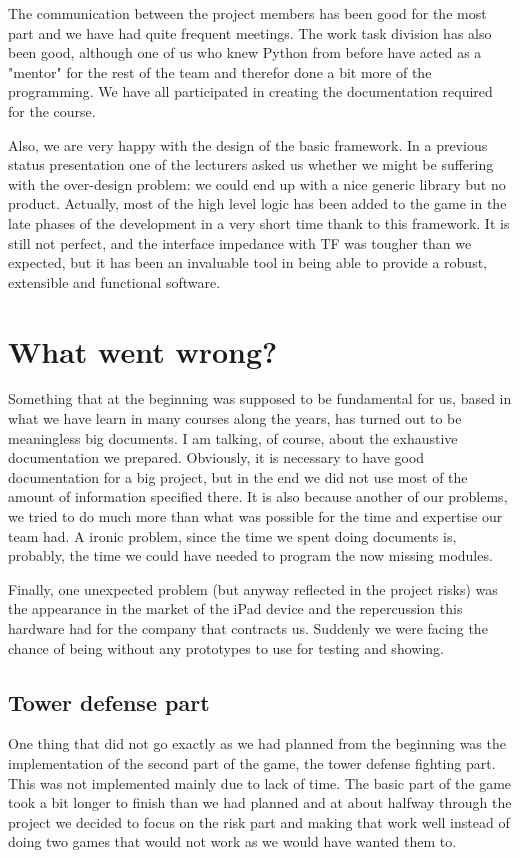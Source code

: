 \documentclass[12pt,a4paper]{article}
\begin{document}
The communication between the project members has been good for the
most part and we have had quite frequent meetings. The work task
division has also been good, although one of us who knew Python from
before have acted as a "mentor" for the rest of the team and therefor
done a bit more of the programming. We have all participated in
creating the documentation required for the course.

Also, we are very happy with the design of the basic framework. In a
previous status presentation one of the lecturers asked us whether we might
be suffering with the over-design problem: we could end up with a nice
generic library but no product. Actually, most of the high level logic
has been added to the game in the late phases of the development in a
very short time thank to this framework. It is still not perfect, and
the interface impedance with TF was tougher than we expected, but it
has been an invaluable tool in being able to provide a robust,
extensible and functional software.

\section{What went wrong?}

Something that at the beginning was supposed to be fundamental for us, based in what we have learn in many courses along the years, has turned out to be meaningless big documents. I am talking, of course, about the exhaustive documentation we prepared. Obviously, it is necessary to have good documentation for a big project, but in the end we did not use most of the amount of information specified there. It is also because another of our problems, we tried to do much more than what was possible for the time and expertise our team had. A ironic problem, since the time we spent doing documents is, probably, the time we could have needed to program the now missing modules.

Finally, one unexpected problem (but anyway reflected in the project risks) was the appearance in the market of the iPad device and the repercussion this hardware had for the company that contracts us. Suddenly we were facing the chance of being without any prototypes to use for testing and showing.

\subsection {Tower defense part}
One thing that did not go exactly as we had planned from the beginning was the implementation of the second part of the game, the tower defense fighting part. This was not implemented mainly due to lack of time. The basic part of the game took a bit longer to finish than we had planned and at about halfway through the project we decided to focus on the risk part and making that work well instead of doing two games that would not work as we would have wanted them to. 
\end{document}
